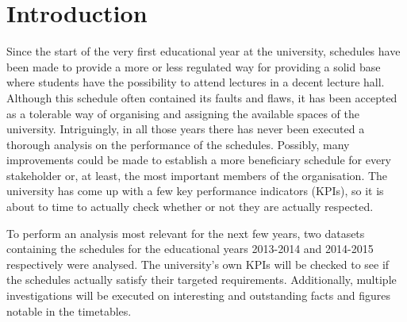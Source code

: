 \section{Introduction}
Since the start of the very first educational year at the university, schedules have been made to provide a more or less regulated way for providing a solid base where students have the possibility to attend lectures in a decent lecture hall. Although this schedule often contained its faults and flaws, it has been accepted as a tolerable way of organising and assigning the available spaces of the university. Intriguingly, in all those years there has never been executed a thorough analysis on the performance of the schedules. Possibly, many improvements could be made to establish a more beneficiary schedule for every stakeholder or, at least, the most important members of the organisation. The university has come up with a few key performance indicators (KPIs), so it is about to time to actually check whether or not they are actually respected.

To perform an analysis most relevant for the next few years, two datasets containing the schedules for the educational years 2013-2014 and 2014-2015 respectively were analysed. The university’s own KPIs will be checked to see if the schedules actually satisfy their targeted requirements. Additionally, multiple investigations will be executed on interesting and outstanding facts and figures notable in the timetables.
